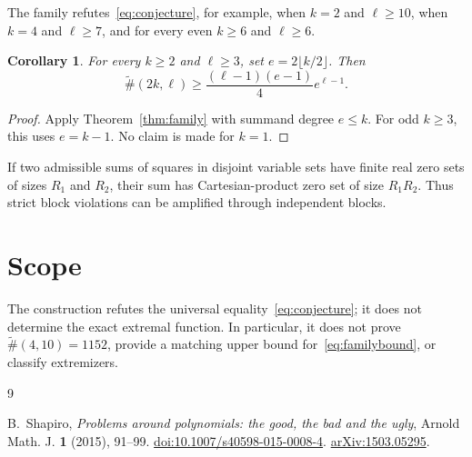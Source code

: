 \documentclass[a4paper,11pt]{amsart}
\newtheorem{corollary}[theorem]{Corollary}
\theoremstyle{remark}
\begin{document}
The family refutes~\eqref{eq:conjecture}, for example, when $k=2$ and $\ell\ge10$, when $k=4$ and $\ell\ge7$, and for every even $k\ge6$ and $\ell\ge6$.

\begin{corollary}\label{cor:transfer}
For every $k\ge2$ and $\ell\ge3$, set $e=2\lfloor k/2\rfloor$. Then
\[
 \widetilde{\#}(2k,\ell)
 \ge\frac{(\ell-1)(e-1)}4e^{\ell-1}.
\]
\end{corollary}

\begin{proof}
Apply Theorem~\ref{thm:family} with summand degree $e\le k$. For odd $k\ge3$, this uses $e=k-1$. No claim is made for $k=1$.
\end{proof}

If two admissible sums of squares in disjoint variable sets have finite real zero sets of sizes $R_1$ and $R_2$, their sum has Cartesian-product zero set of size $R_1R_2$. Thus strict block violations can be amplified through independent blocks.

\section{Scope}

The construction refutes the universal equality~\eqref{eq:conjecture}; it does not determine the exact extremal function. In particular, it does not prove $\widetilde{\#}(4,10)=1152$, provide a matching upper bound for~\eqref{eq:familybound}, or classify extremizers.

\begin{thebibliography}{9}

B.~Shapiro,
\emph{Problems around polynomials: the good, the bad and the ugly},
Arnold Math. J. \textbf{1} (2015), 91--99.
\href{https://doi.org/10.1007/s40598-015-0008-4}{doi:10.1007/s40598-015-0008-4}.
\href{https://arxiv.org/abs/1503.05295}{arXiv:1503.05295}.

\end{thebibliography}
\end{document}
